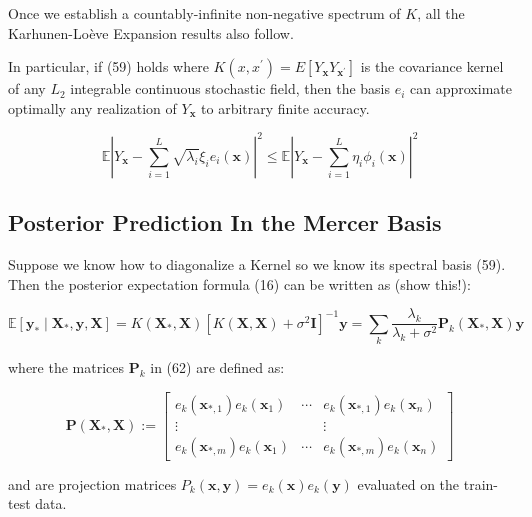 \documentclass[11pt]{article}
\theoremstyle{plain} %
\theoremstyle{remark}
\begin{document}
Once we establish a countably-infinite non-negative spectrum of $K$, all the
Karhunen-Loève Expansion results also follow.

In particular, if (59) holds where $K\left(x,
  x^{\prime}\right)=E\left[Y_{\mathbf{x}} Y_{\mathbf{x}^{\prime}}\right]$ is the covariance
kernel of any $L_{2}$ integrable continuous stochastic field, then the basis
$e_{i}$ can approximate optimally any realization of $Y_{\mathbf{x}}$ to
arbitrary finite accuracy.

$$
  \mathbb{E}\left|Y_{\mathbf{x}}-\sum_{i=1}^{L} \sqrt{\lambda_{i}} \xi_{i} e_{i}(\mathbf{x})\right|^{2} \leq \mathbb{E}\left|Y_{\mathbf{x}}-\sum_{i=1}^{L} \eta_{i} \phi_{i}(\mathbf{x})\right|^{2}
$$

\subsection{Posterior Prediction In the Mercer Basis}
Suppose we know how to diagonalize a Kernel so we know its spectral basis (59).
Then the posterior expectation formula (16) can be written as (show this!):

$$
    \mathbb{E}\left[\mathbf{y}_{*} \mid \mathbf{X}_{*}, \mathbf{y}, \mathbf{X}\right]
    =K\left(\mathbf{X}_{*}, \mathbf{X}\right)\left[K(\mathbf{X}, \mathbf{X})+\sigma^{2} \mathbf{I}\right]^{-1} \mathbf{y} 
    =\sum_{k} \frac{\lambda_{k}}{\lambda_{k}+\sigma^{2}} \mathbf{P}_{k}\left(\mathbf{X}_{*}, \mathbf{X}\right) \mathbf{y}
$$

where the matrices $\mathbf{P}_{k}$ in (62) are defined as:

$$
  \mathbf{P}\left(\mathbf{X}_{*}, \mathbf{X}\right):=\left[\begin{array}{ccc}
      e_{k}\left(\mathbf{x}_{*, 1}\right) e_{k}\left(\mathbf{x}_{1}\right) & \cdots & e_{k}\left(\mathbf{x}_{*, 1}\right) e_{k}\left(\mathbf{x}_{n}\right) \\
      \vdots                                                               &        & \vdots                                                               \\
      e_{k}\left(\mathbf{x}_{*, m}\right) e_{k}\left(\mathbf{x}_{1}\right) & \cdots & e_{k}\left(\mathbf{x}_{*, m}\right) e_{k}\left(\mathbf{x}_{n}\right)
    \end{array}\right]
$$

and are projection matrices $P_{k}(\mathbf{x}, \mathbf{y})=e_{k}(\mathbf{x})
  e_{k}(\mathbf{y})$ evaluated on the train-test data.
\end{document}
